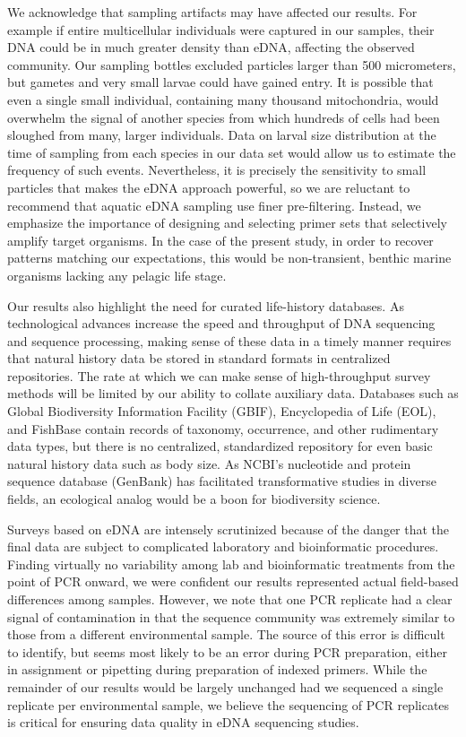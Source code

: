 \documentclass[11pt,letterpaper]{article} %
\begin{document}
We acknowledge that sampling artifacts may have affected our results. For example if entire multicellular individuals were captured in our samples, their DNA could be in much greater density than eDNA, affecting the observed community. Our sampling bottles excluded particles larger than 500 micrometers, but gametes and very small larvae could have gained entry. It is possible that even a single small individual, containing many thousand mitochondria, would overwhelm the signal of another species from which hundreds of cells had been sloughed from many, larger individuals. Data on larval size distribution at the time of sampling from each species in our data set would allow us to estimate the frequency of such events. Nevertheless, it is precisely the sensitivity to small particles that makes the eDNA approach powerful, so we are reluctant to recommend that aquatic eDNA sampling use finer pre-filtering. Instead, we emphasize the importance of designing and selecting primer sets that selectively amplify target organisms. In the case of the present study, in order to recover patterns matching our expectations, this would be non-transient, benthic marine organisms lacking any pelagic life stage.


Our results also highlight the need for curated life-history databases. As technological advances increase the speed and throughput of DNA sequencing and sequence processing, making sense of these data in a timely manner requires that natural history data be stored in standard formats in centralized repositories. The rate at which we can make sense of high-throughput survey methods will be limited by our ability to collate auxiliary data. Databases such as Global Biodiversity Information Facility (GBIF), Encyclopedia of Life (EOL), and FishBase \citep{eol,  fishbase} contain records of taxonomy, occurrence, and other rudimentary data types, but there is no centralized, standardized repository for even basic natural history data such as body size. As NCBI's nucleotide and protein sequence database (GenBank) has facilitated transformative studies in diverse fields, an ecological analog would be a boon for biodiversity science.


Surveys based on eDNA are intensely scrutinized because of the danger that the final data are subject to complicated laboratory and bioinformatic procedures. Finding virtually no variability among lab and bioinformatic treatments from the point of PCR onward, we were confident our results represented actual field-based differences among samples. However, we note that one PCR replicate had a clear signal of contamination in that the sequence community was extremely similar to those from a different environmental sample. The source of this error is difficult to identify, but seems most likely to be an error during PCR preparation, either in assignment or pipetting during preparation of indexed primers. While the remainder of our results would be largely unchanged had we sequenced a single replicate per environmental sample, we believe the sequencing of PCR replicates is critical for ensuring data quality in eDNA sequencing studies.
\end{document}
